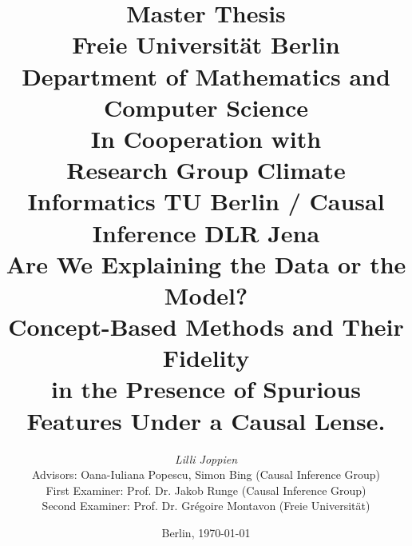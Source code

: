 %

\title{
{\Large Master Thesis}\\ 
{\Large Freie Universität Berlin}\\
{\Large Department of Mathematics and Computer Science}\\
[3ex]
{\normalsize In Cooperation with \\ Research Group Climate Informatics TU Berlin / Causal Inference DLR Jena}\\
[7ex]
{\huge Are We Explaining the Data or the Model?} \\
[1ex]
{ Concept-Based Methods and Their Fidelity \\ in the Presence of Spurious Features Under a Causal Lense.}}

\author{
{\emph{\normalsize Lilli Joppien}}\\
[18ex]   
{\normalsize Advisors: Oana-Iuliana Popescu, Simon Bing (Causal Inference Group)} \\
{\normalsize First Examiner: Prof. Dr. Jakob Runge (Causal Inference Group)} \\
{\normalsize Second Examiner: Prof. Dr. Grégoire Montavon (Freie Universität) }}
\vspace{6ex}
\date{\normalsize Berlin, \today}
\maketitle

\pagestyle{empty}
